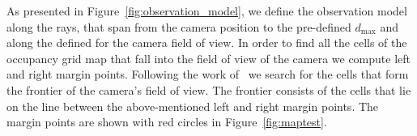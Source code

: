 \begin{figure}[t]%
\centering
{}\hspace{5mm}
\caption{}
\end{figure}

As presented in Figure~\ref{fig:observation_model}, we define the observation
model along the rays, that span from the camera position to the pre-defined
$d_{\max}$ and along the defined for the camera field of view. In order to
find all the cells of the occupancy grid map that fall into the field of view
of the camera we compute left and right margin points. Following the work
of~\citet{bresenham1965} we search for the cells that form the frontier of the
camera's field of view. The frontier consists of the cells that lie on the
line between the above-mentioned left and right margin points. The margin
points are shown with red circles in Figure~\ref{fig:maptest}.


